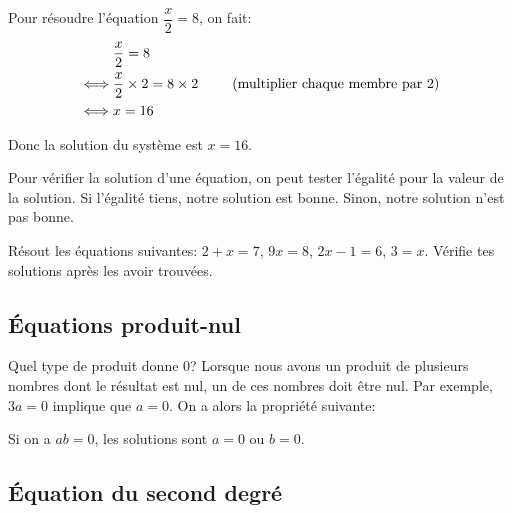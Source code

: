 \begin{exemple}
    Pour résoudre l'équation $\dfrac{x}{2} = 8$, on fait:
    \begin{alignat*}{3}
        & \dfrac{x}{2} = 8&\\
        \iff & \dfrac{x}{2} \times 2 = 8 \times 2& \hspace{5mm} \text{(multiplier chaque membre par 2)}\\
        \iff & x = 16&
    \end{alignat*}

    Donc la solution du système est $x = 16$.
\end{exemple}

\begin{astuce}
    Pour vérifier la solution d'une équation, on peut tester l'égalité pour la valeur de la solution. Si l'égalité tiens, notre solution est bonne. Sinon, notre solution n'est pas bonne.
\end{astuce}

\begin{exercicefr}
    Résout les équations suivantes: $2 + x = 7$, $9x = 8$, $2x - 1 = 6$, $3 = x$. Vérifie tes solutions après les avoir trouvées.
\end{exercicefr}


\subsection{Équations produit-nul}

Quel type de produit donne 0? Lorsque nous avons un produit de plusieurs nombres dont le résultat est nul, un de ces nombres doit être nul. Par exemple, $3a = 0$ implique que $a=0$. On a alors la propriété suivante:

\begin{propriete}
    Si on a $ab = 0$, les solutions sont $a = 0$ ou $b = 0$.
\end{propriete}

\subsection{Équation du second degré}